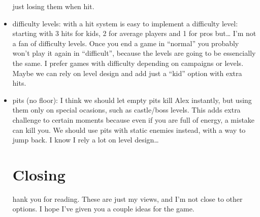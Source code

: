 \documentclass{gd-document}
\begin{document}
\begin{itemize}
  just losing them when hit.
\item difficulty levels: with a hit system is easy to implement a
  difficulty level: starting with 3 hits for kids, 2 for average
  players and 1 for pros but… I’m not a fan of difficulty levels. Once
  you end a game in “normal” you probably won’t play it again in
  “difficult”, because the levels are going to be essencially the
  same. I prefer games with difficulty depending on campaigns or
  levels. Maybe we can rely on level design and add just a “kid”
  option with extra hits.
\item pits (no floor): I think we should let empty pits kill Alex
  instantly, but using them only on special ocasions, such as
  castle/boss levels. This adds extra challenge to certain moments
  because even if you are full of energy, a mistake can kill you. We
  should use pits with static enemies instead, with a way to jump
  back. I know I rely a lot on level design…

\section{Closing}

hank you for reading. These are just my views, and I’m not close to
other options. I hope I’ve given you a couple ideas for the game.

\end{itemize}
\end{document}
